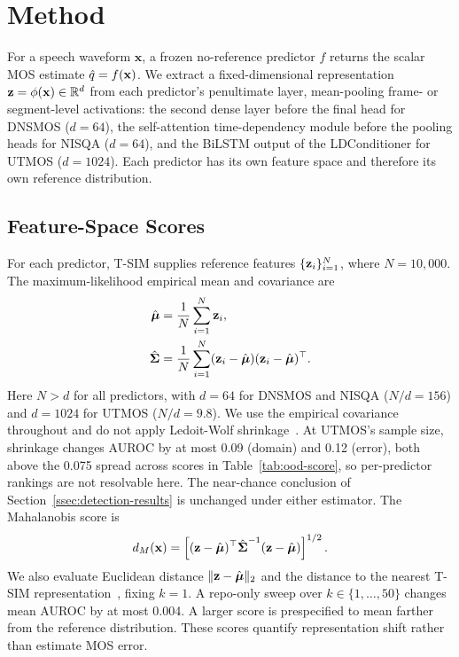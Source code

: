 \vspace{-.2cm}
\section{Method}
\label{sec:method}

For a speech waveform $\mathbf{x}$, a frozen no-reference predictor $f$ returns the scalar MOS estimate $\hat{q}=f(\mathbf{x})$. We extract a fixed-dimensional representation $\mathbf{z}=\phi(\mathbf{x})\in\mathbb{R}^{d}$ from each predictor's penultimate layer, mean-pooling frame- or segment-level activations: the second dense layer before the final head for DNSMOS ($d=64$), the self-attention time-dependency module before the pooling heads for NISQA ($d=64$), and the BiLSTM output of the LDConditioner for UTMOS ($d=1024$). Each predictor has its own feature space and therefore its own reference distribution.

\vspace{-.2cm}
\subsection{Feature-Space Scores}
\label{ssec:features}

For each predictor, T-SIM supplies reference features $\{\mathbf{z}_i\}_{i=1}^{N}$, where $N=10{,}000$. The maximum-likelihood empirical mean and covariance are
\begin{align}
    \hat{\boldsymbol{\mu}}
    &= \frac{1}{N}\sum_{i=1}^{N}\mathbf{z}_i,
    \label{eq:mean} \\
    \hat{\boldsymbol{\Sigma}}
    &= \frac{1}{N}\sum_{i=1}^{N}
    (\mathbf{z}_i-\hat{\boldsymbol{\mu}})(\mathbf{z}_i-\hat{\boldsymbol{\mu}})^\top.
    \label{eq:cov}
\end{align}
Here $N>d$ for all predictors, with $d=64$ for DNSMOS and NISQA ($N/d=156$) and $d=1024$ for UTMOS ($N/d=9.8$). We use the empirical covariance throughout and do not apply Ledoit-Wolf shrinkage~\cite{LedoitWolf2004}. At UTMOS's sample size, shrinkage changes AUROC by at most 0.09 (domain) and 0.12 (error), both above the 0.075 spread across scores in Table~\ref{tab:ood-score}, so per-predictor rankings are not resolvable here. The near-chance conclusion of Section~\ref{ssec:detection-results} is unchanged under either estimator. The Mahalanobis score is
\begin{align}
    d_M(\mathbf{x})
    =
    \left[
        (\mathbf{z}-\hat{\boldsymbol{\mu}})^\top
        \hat{\boldsymbol{\Sigma}}^{-1}
        (\mathbf{z}-\hat{\boldsymbol{\mu}})
    \right]^{1/2}.
    \label{eq:mahal}
\end{align}
We also evaluate Euclidean distance $\lVert\mathbf{z}-\hat{\boldsymbol{\mu}}\rVert_2$ and the distance to the nearest T-SIM representation~\cite{Sun2022}, fixing $k=1$. A repo-only sweep over $k\in\{1,\ldots,50\}$ changes mean AUROC by at most 0.004. A larger score is prespecified to mean farther from the reference distribution. These scores quantify representation shift rather than estimate MOS error.

